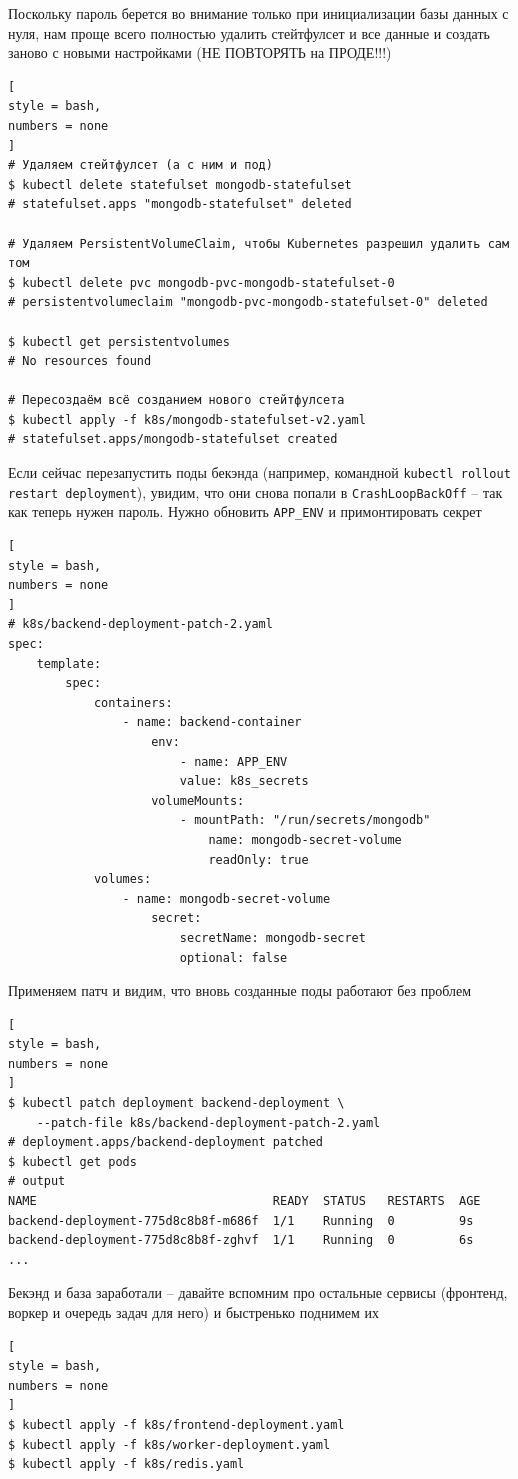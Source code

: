 \documentclass[%
	11pt,
	a4paper,
	utf8,
		]{article}
\begin{document}
Поскольку пароль берется во внимание только при инициализации базы данных с нуля, нам проще всего полностью удалить стейтфулсет и все данные и создать заново с новыми настройками (НЕ ПОВТОРЯТЬ на ПРОДЕ!!!)
\begin{lstlisting}[
style = bash,
numbers = none
]
# Удаляем стейтфулсет (а с ним и под)
$ kubectl delete statefulset mongodb-statefulset
# statefulset.apps "mongodb-statefulset" deleted

# Удаляем PersistentVolumeClaim, чтобы Kubernetes разрешил удалить сам том
$ kubectl delete pvc mongodb-pvc-mongodb-statefulset-0 
# persistentvolumeclaim "mongodb-pvc-mongodb-statefulset-0" deleted

$ kubectl get persistentvolumes
# No resources found

# Пересоздаём всё созданием нового стейтфулсета
$ kubectl apply -f k8s/mongodb-statefulset-v2.yaml
# statefulset.apps/mongodb-statefulset created
\end{lstlisting}

Если сейчас перезапустить поды бекэнда (например, командной \verb|kubectl rollout restart deployment|), увидим, что они снова попали в \verb*|CrashLoopBackOff| -- так как теперь нужен пароль. Нужно обновить \verb*|APP_ENV| и примонтировать секрет
\begin{lstlisting}[
style = bash,
numbers = none
]
# k8s/backend-deployment-patch-2.yaml
spec:
	template:
		spec:
			containers:
				- name: backend-container
					env:
						- name: APP_ENV
						value: k8s_secrets
					volumeMounts:
						- mountPath: "/run/secrets/mongodb"
							name: mongodb-secret-volume
							readOnly: true
			volumes:
				- name: mongodb-secret-volume
					secret:
						secretName: mongodb-secret
						optional: false
\end{lstlisting}

Применяем патч и видим, что вновь созданные поды работают без проблем
\begin{lstlisting}[
style = bash,
numbers = none
]
$ kubectl patch deployment backend-deployment \
    --patch-file k8s/backend-deployment-patch-2.yaml
# deployment.apps/backend-deployment patched
$ kubectl get pods
# output
NAME                                 READY  STATUS   RESTARTS  AGE
backend-deployment-775d8c8b8f-m686f  1/1    Running  0         9s
backend-deployment-775d8c8b8f-zghvf  1/1    Running  0         6s
...
\end{lstlisting}

Бекэнд и база заработали -- давайте вспомним про остальные сервисы (фронтенд, воркер и очередь задач для него) и быстренько поднимем их
\begin{lstlisting}[
style = bash,
numbers = none
]
$ kubectl apply -f k8s/frontend-deployment.yaml
$ kubectl apply -f k8s/worker-deployment.yaml
$ kubectl apply -f k8s/redis.yaml
\end{lstlisting}
\end{document}
